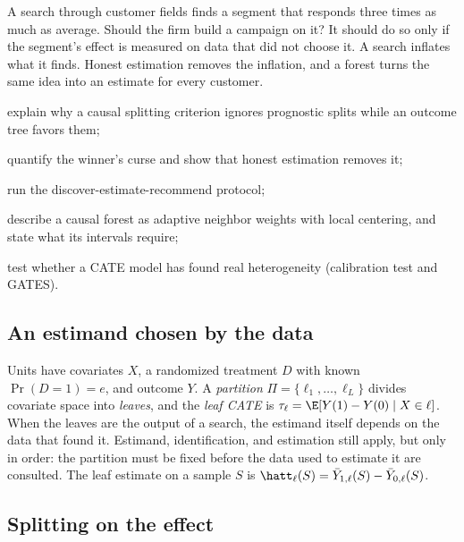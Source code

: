 \documentclass[11pt]{article}
\begin{document}

\begin{decision}
A search through customer fields finds a segment that responds three times as much as average. Should the
firm build a campaign on it? It should do so only if the segment's effect is measured on data that did not
choose it. A search inflates what it finds. Honest estimation removes the inflation, and a forest turns the same
idea into an estimate for every customer.
\end{decision}

\begin{goals}
  \item explain why a causal splitting criterion ignores prognostic splits while an outcome tree favors them;
  \item quantify the winner's curse and show that honest estimation removes it;
  \item run the discover-estimate-recommend protocol;
  \item describe a causal forest as adaptive neighbor weights with local centering, and state what its
  intervals require;
  \item test whether a CATE model has found real heterogeneity (calibration test and GATES).
\end{goals}

\sectionone

\subsection{An estimand chosen by the data}

Units have covariates $X$, a randomized treatment $D$ with known $\Pr(D=1) = e$, and outcome $Y$. A
\emph{partition} $\Pi = \{\ell_1, \dots, \ell_L\}$ divides covariate space into \emph{leaves}, and the
\emph{leaf CATE} is $\tau_\ell = \E[Y(1) - Y(0) \mid X \in \ell]$. When the leaves are the output of a search, the
estimand itself depends on the data that found it. Estimand, identification, and estimation still apply, but
only in order: the partition must be fixed before the data used to estimate it are consulted. The leaf
estimate on a sample $S$ is $\hatt_\ell(S) = \bar Y_{1,\ell}(S) - \bar Y_{0,\ell}(S)$.

\subsection{Splitting on the effect}
\end{document}
